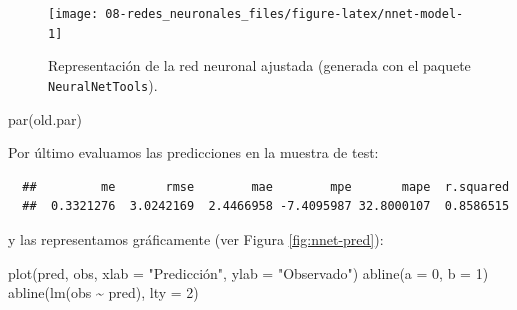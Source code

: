 \documentclass[
]{book}
\newenvironment{Shaded}{\begin{snugshade}}{\end{snugshade}}
\newcommand{\AttributeTok}[1]{\textcolor[rgb]{0.77,0.63,0.00}{#1}}
\newcommand{\DecValTok}[1]{\textcolor[rgb]{0.00,0.00,0.81}{#1}}
\newcommand{\FunctionTok}[1]{\textcolor[rgb]{0.00,0.00,0.00}{#1}}
\newcommand{\NormalTok}[1]{#1}
\newcommand{\OtherTok}[1]{\textcolor[rgb]{0.56,0.35,0.01}{#1}}
\newcommand{\SpecialCharTok}[1]{\textcolor[rgb]{0.00,0.00,0.00}{#1}}
\newcommand{\StringTok}[1]{\textcolor[rgb]{0.31,0.60,0.02}{#1}}
\theoremstyle{break}
\theoremstyle{nonumberplain}
\begin{document}
\begin{figure}[!htb]

{\centering \texttt{[image: 08-redes\_neuronales\_files/figure-latex/nnet-model-1]} 

}

\caption{Representación de la red neuronal ajustada (generada con el paquete \texttt{NeuralNetTools}).}\label{fig:nnet-model}
\end{figure}

\begin{Shaded}
\begin{Highlighting}[]
\FunctionTok{par}\NormalTok{(old.par)}
\end{Highlighting}
\end{Shaded}

Por último evaluamos las predicciones en la muestra de test:

\begin{Shaded}
\end{Shaded}

\begin{verbatim}
  ##         me       rmse        mae        mpe       mape  r.squared 
  ##  0.3321276  3.0242169  2.4466958 -7.4095987 32.8000107  0.8586515
\end{verbatim}

y las representamos gráficamente (ver Figura \ref{fig:nnet-pred}):



\begin{Shaded}
\begin{Highlighting}[]
\FunctionTok{plot}\NormalTok{(pred, obs, }\AttributeTok{xlab =} \StringTok{"Predicción"}\NormalTok{, }\AttributeTok{ylab =} \StringTok{"Observado"}\NormalTok{)}
\FunctionTok{abline}\NormalTok{(}\AttributeTok{a =} \DecValTok{0}\NormalTok{, }\AttributeTok{b =} \DecValTok{1}\NormalTok{)}
\FunctionTok{abline}\NormalTok{(}\FunctionTok{lm}\NormalTok{(obs }\SpecialCharTok{\textasciitilde{}}\NormalTok{ pred), }\AttributeTok{lty =} \DecValTok{2}\NormalTok{)}
\end{Highlighting}
\end{Shaded}
\end{document}
